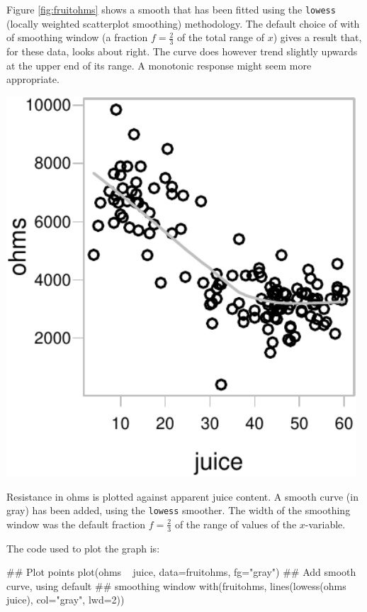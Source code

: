 \documentclass{tufte-book}\usepackage[]{graphicx}\usepackage[]{color}
\newcommand{\txtt}[1]{\texttt{#1}}
\begin{document}
Figure \ref{fig:fruitohms} shows a smooth that has been fitted using
the \txtt{lowess} (locally weighted scatterplot smoothing)
methodology.  The default choice of with of smoothing window (a fraction
$f = \frac{2}{3}$ of the total range of $x$) gives a result that,
for these data, looks about right. The curve does however trend
slightly upwards at the upper end of its range.  A monotonic
response might seem more appropriate.

\begin{marginfigure}
\begin{Schunk}


\centerline{\includegraphics[width=0.98\textwidth]{figs/9-smooth-ohms-1} }

\end{Schunk}
  \caption{Resistance in ohms is plotted against apparent juice
    content.  A smooth curve (in gray) has been added, using the
    \txtt{lowess} smoother.  The width of the smoothing window was the
    default fraction $f = \frac{2}{3}$ of the range of values of the
    $x$-variable.}\label{fig:fruitohms}
\end{marginfigure}

The code used to plot the graph is:
\begin{Schunk}
\begin{Sinput}
## Plot points
plot(ohms ~ juice, data=fruitohms, fg="gray")
## Add smooth curve, using default
## smoothing window
with(fruitohms,
     lines(lowess(ohms ~ juice), col="gray", lwd=2))
\end{Sinput}
\end{Schunk}
\end{document}
